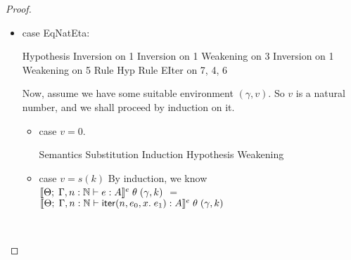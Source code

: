 \begin{proof}
\begin{itemize}
\item case EqNatEta:
  \begin{eqnproof}
              {Hypothesis}
              {Inversion on 1}
              {Inversion on 1}
              {Weakening on 3}
              {Inversion on 1}
              {Weakening on 5}
              {Rule Hyp}
              {Rule EIter on 7, 4, 6}
  \end{eqnproof}

Now, assume we have some suitable environment $(\gamma, v)$. So $v$ is a natural
number, and we shall proceed by induction on it. 

\begin{itemize}
  \item case $v = 0$. 

    \begin{eqnproof}[\interpE{\judgeE{\Gamma,n:\N}{e}{A}}\;\theta\;(\gamma,0) = ]
            {Semantics}
            {Substitution}
            {Induction Hypothesis}
            {Weakening}
    \end{eqnproof}

\item case $v = s(k)$
  By induction, we know \\
$[\![{{\Theta};\;{\Gamma, n:\mathbb{N}} \vdash {e} : {A}}]\!]^e\;\theta\;(\gamma, k)$ $=$ $[\![{{\Theta};\;{\Gamma,n:\mathbb{N}} \vdash {\mathsf{iter}(n, {e_0}, {x}.\; {e_1})} : {A}}]\!]^e\;\theta\;(\gamma, k)$

\ \\


\end{itemize}
\end{itemize}
\end{proof}
